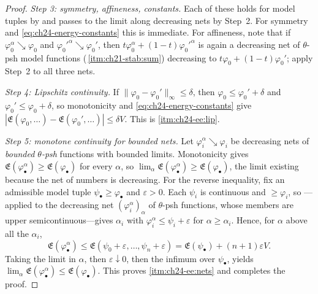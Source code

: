 \begin{proof}
\emph{Step 3: symmetry, affineness, constants.}  Each of these holds for
model tuples by  and passes to the limit along
decreasing nets by Step~2.  For symmetry and \eqref{eq:ch24-energy-constants}
this is immediate.  For affineness, note that if
\(\varphi_0^\alpha\searrow\varphi_0\) and
\(\varphi_0'^\alpha\searrow\varphi_0'\), then
\(t\varphi_0^\alpha+(1-t)\varphi_0'^\alpha\) is again a decreasing net of
\(\theta\)-psh model functions
(\,\cref{itm:ch21-stab:sum}) decreasing to
\(t\varphi_0+(1-t)\varphi_0'\); apply Step~2 to all three nets.

\emph{Step 4: Lipschitz continuity.}  If
\(\|\varphi_0-\varphi_0'\|_\infty\leq\delta\), then
\(\varphi_0\leq\varphi_0'+\delta\) and \(\varphi_0'\leq\varphi_0+\delta\),
so monotonicity and \eqref{eq:ch24-energy-constants} give
\(|\mathfrak E(\varphi_0,\ldots)-\mathfrak E(\varphi_0',\ldots)|\leq\delta V\).
This is \cref{itm:ch24-ee:lip}.

\emph{Step 5: monotone continuity for bounded nets.}  Let
\(\varphi_i^\alpha\searrow\varphi_i\) be decreasing nets of \emph{bounded
\(\theta\)-psh} functions with bounded limits.  Monotonicity gives
\(\mathfrak E(\varphi^\alpha_\bullet)\geq\mathfrak E(\varphi_\bullet)\) for
every \(\alpha\), so
\(\lim_\alpha\mathfrak E(\varphi^\alpha_\bullet)\geq
 \mathfrak E(\varphi_\bullet)\), the limit existing because the net of
numbers is decreasing.  For the reverse inequality, fix an admissible
model tuple \(\psi_\bullet\geq\varphi_\bullet\) and \(\varepsilon>0\).  Each
\(\psi_i\) is continuous and \(\geq\varphi_i\), so
---applied to the decreasing net
\((\varphi_i^\alpha)_\alpha\) of \(\theta\)-psh functions, whose members are
upper semicontinuous---gives \(\alpha_i\) with
\(\varphi_i^\alpha\leq\psi_i+\varepsilon\) for \(\alpha\geq\alpha_i\).
Hence, for \(\alpha\) above all the \(\alpha_i\),
\[
 \mathfrak E(\varphi^\alpha_\bullet)
 \leq\mathfrak E(\psi_0+\varepsilon,\ldots,\psi_n+\varepsilon)
 =\mathfrak E(\psi_\bullet)+(n+1)\varepsilon V .
\]
Taking the limit in \(\alpha\), then \(\varepsilon\downarrow0\), then the
infimum over \(\psi_\bullet\), yields
\(\lim_\alpha\mathfrak E(\varphi^\alpha_\bullet)\leq
 \mathfrak E(\varphi_\bullet)\).  This proves \cref{itm:ch24-ee:nets} and
completes the proof.
\end{proof}

